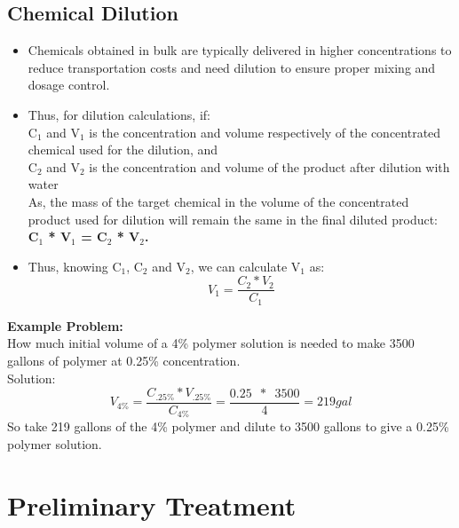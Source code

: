 \subsection{Chemical Dilution} 
\begin{itemize}
\item Chemicals obtained in bulk are typically delivered in higher concentrations to reduce transportation costs and need dilution to ensure proper mixing and dosage control.

\item Thus, for dilution calculations, if:\\
\vspace{0.2cm}
C$_1$ and V$_1$ is the concentration and volume respectively of the concentrated chemical used for the dilution, and\\
\vspace{0.2cm}
C$_2$ and V$_2$ is the concentration and volume of the product after dilution with water\\
\vspace{0.2cm}
As, the mass of the target chemical in the volume of the concentrated product used for dilution will remain the same in the final diluted product:\\
\vspace{0.3cm}
\textbf{C$_1$ * V$_1$ =  C$_2$ * V$_2$.}\\

\item Thus, knowing C$_1$, C$_2$ and V$_2$, we can calculate V$_1$ as: $$V_1 = \frac{C_2 * V_2}{C_1}$$
\end{itemize}

\textbf{Example Problem:}\\
\vspace{0.2cm}
How much initial volume of a 4\% polymer solution is needed to make 3500 gallons of polymer at 0.25\% concentration.\\
\vspace{0.2cm}
Solution:\\
\vspace{0.2cm}
$$V_{4\%} = \frac{C_{.25\%} * V_{.25\%}}{C_{4\%}} = \frac{0.25 \enspace * \enspace 3500}{4}= 219 gal $$ 
\vspace{0.2cm}
So take 219 gallons of the 4\% polymer and dilute to 3500 gallons to give a 0.25\% polymer solution.


\section{Preliminary Treatment} 


